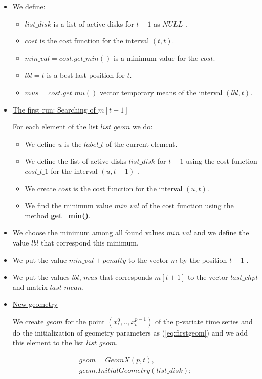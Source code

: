 \documentclass{report}
\begin{document}
\begin{itemize}
	\item We define:
	\begin{itemize}
		\item $list\_disk$ is a list of active disks for $t-1$ as $NULL$ .
		\item $cost$  is the cost function for the interval $(t,t)$.
		\item $min\_val = cost.get\_min()$  is a minimum value for  the  $cost$.
		\item $lbl = t$ is a best last position for $t$.
		\item $mus = cost.get\_mu()$ vector temporary means of the interval $(lbl, t)$.
	\end{itemize}
	
	\item \underline {The first run: Searching of $m[t+1]$}
	
	For each element of the list $list\_geom$ we do:
	
	\begin{itemize}
		\item We define $u$ is the $label\_t$ of the current element.
		\item We define the list of active disks  $list\_disk$ for $t-1$ using the cost function $cost\_t\_1$  for the interval $(u,t-1)$ .
		\item We create $cost$  is the cost function for the interval $(u,t)$.	
		\item We find the minimum value  $min\_val$ of the cost function using the method {\bfseries get\_min()}. 
	\end{itemize}
	\item We choose the minimum  among all found values ${min\_val}$ and we define the value $lbl$ that correspond this minimum.	
	\item We put the value $min\_val + penalty$ to the vector $m$  by the position $t+1$ .	
	\item We put the values  $lbl$, $mus$ that corresponds $m[t+1]$ to the vector $last\_chpt$ and matrix $last\_mean$.

	\item \underline {New geometry}

	 We create $geom$ for the  point $(x_t^0,..,x_t^{p-1})$ of the p-variate time series and do the initialization of geometry parameters as (\ref{eq:firstgeom})  and we add this element to the list $list\_geom$.

	\begin{equation}
		\begin{gathered}
		geom = GeomX(p,t),\\
		geom.InitialGeometry(list\_disk);
		\label{eq:firstgeom}
	\end{gathered}
	\end{equation}	



\end{itemize}
\end{document}
